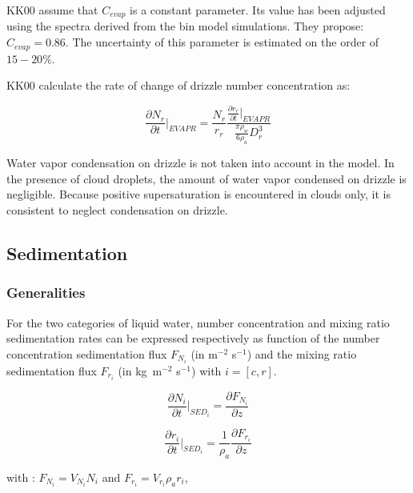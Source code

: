\noindent KK00 assume that $C_{evap}$ is a constant parameter. Its value has been adjusted using the spectra derived from the bin model simulations. They propose: $C_{evap}=0.86$. The uncertainty of this parameter is estimated on the order of $15-20\%$.

\noindent KK00 calculate the rate of change of drizzle number concentration as:

\begin{equation}
\frac{\displaystyle{\partial N_r}}{\displaystyle{\partial t}} \Big|_{EVAPR}=
\frac{N_r}{r_r}\frac{\frac{\displaystyle{\partial r_r}}{\displaystyle{\partial t}} \Big|_{EVAPR}}
{\frac{\pi\rho_w}{6\rho_a}D_r^3}
\end{equation}


\noindent Water vapor condensation on drizzle is not taken into account in the model. In the presence of cloud droplets, the amount of water vapor condensed on drizzle is negligible. Because positive supersaturation is encountered in clouds only, it is consistent to neglect condensation on drizzle.


\subsection{Sedimentation} 

\subsubsection{Generalities}

For the two categories of liquid water, number concentration and mixing ratio sedimentation rates  can be expressed respectively as function of the number concentration sedimentation flux $F_{N_i}$ (in m$^{-2}$ s$^{-1}$) and the mixing ratio sedimentation flux $F_{r_i}$ 
(in kg~m$^{-2}$ s$^{-1}$) with $i=[c, r]$.

\begin{equation}
\frac{\displaystyle{\partial N_i}}{\displaystyle{\partial t}} \Big|_{SED_i}=
\frac{\displaystyle{\partial F_{N_i}}}{\displaystyle{\partial z}}
\end{equation}

\begin{equation}
\frac{\displaystyle{\partial r_i}}{\displaystyle{\partial t}} \Big|_{SED_i}=
\frac{1}{\rho_a}\frac{\displaystyle{\partial F_{r_i}}}{\displaystyle{\partial z}}
\end{equation}

\noindent with : $F_{N_i}=V_{N_i}N_i$ and $F_{r_i}=V_{r_i}\rho_ar_i$,

